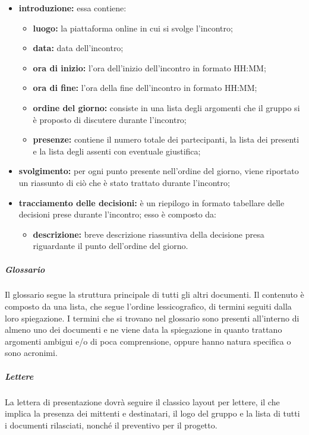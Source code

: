 				\begin{itemize}
						\item \textbf{introduzione:} essa contiene:
							\begin{itemize}
								\item \textbf{luogo:} la piattaforma online in cui si svolge l'incontro;
								\item \textbf{data:} data dell'incontro;
								\item \textbf{ora di inizio:} l'ora dell'inizio dell'incontro in formato HH:MM;
								\item \textbf{ora di fine:} l'ora della fine dell'incontro in formato HH:MM;
								\item \textbf{ordine del giorno:} consiste in una lista degli argomenti che il gruppo si è proposto di discutere durante l'incontro;
								\item \textbf{presenze:} contiene il numero totale dei partecipanti, la lista dei presenti e la lista degli assenti con eventuale giustifica;
							\end{itemize}
							\item \textbf{svolgimento:} per ogni punto presente nell'ordine del giorno, viene riportato un riassunto di ciò che è stato trattato durante l'incontro;
							\item \textbf{tracciamento delle decisioni:} è un riepilogo in formato tabellare delle decisioni prese durante l'incontro; esso è composto da:
							\begin{itemize}
								\item \textbf{descrizione:} breve descrizione riassuntiva della decisione presa riguardante il punto dell'ordine del giorno.
							\end{itemize}
					\end{itemize}
				\subparagraph{Glossario}
				Il glossario segue la struttura principale di tutti gli altri documenti. Il contenuto è composto da una lista, che segue l'ordine lessicografico, di termini seguiti dalla loro spiegazione. I termini che si trovano nel glossario sono presenti all'interno di almeno uno dei documenti e ne viene data la spiegazione in quanto trattano argomenti ambigui e/o di poca comprensione, oppure hanno natura specifica o sono acronimi. 
				\subparagraph{Lettere}
				La lettera di presentazione dovrà seguire il classico layout per lettere, il che implica la presenza dei mittenti e destinatari, il logo del gruppo e la lista di tutti i documenti rilasciati, nonché il preventivo per il progetto.
